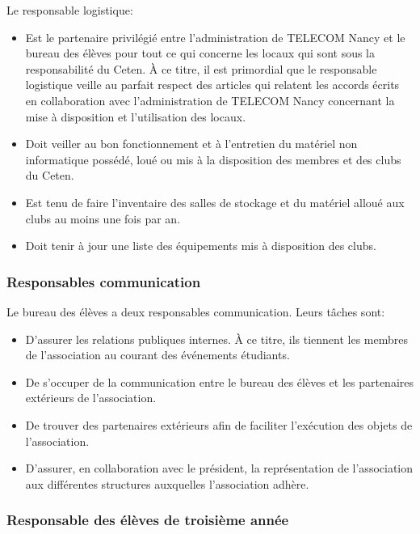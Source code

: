 \documentclass{article} %
\begin{document}
				Le responsable logistique:
				\begin{itemize}
					\item Est le partenaire privilégié entre l’administration de
						TELECOM Nancy et le bureau des élèves pour tout ce qui
						concerne les locaux qui sont sous la responsabilité du
						Ceten. À ce titre, il est primordial que le responsable
						logistique veille au parfait respect des articles qui
						relatent les accords écrits en collaboration avec
						l’administration de TELECOM Nancy concernant la mise à
						disposition et l’utilisation des locaux.
					\item Doit veiller au bon fonctionnement et à l’entretien du
						matériel non informatique possédé, loué ou mis à la
						disposition des membres et des clubs du Ceten.
					\item Est tenu de faire l’inventaire des salles de stockage
						et du matériel alloué aux clubs au moins une fois par
						an.
					\item Doit tenir à jour une liste des équipements mis à
						disposition des clubs.
				\end{itemize}

			\subsubsection{Responsables communication}
\label{ssub:responsables_communication}

				Le bureau des élèves a deux responsables communication. Leurs
				tâches sont:
				\begin{itemize}
					\item D’assurer les relations publiques internes. À ce
						titre, ils tiennent les membres de l’association au
						courant des événements étudiants.
					\item De s’occuper de la communication entre le bureau des
						élèves et les partenaires extérieurs de l’association.
					\item De trouver des partenaires extérieurs afin de
						faciliter l’exécution des objets de l’association.
					\item D’assurer, en collaboration avec le président, la
						représentation de l’association aux différentes
						structures auxquelles l’association adhère. 
				\end{itemize}

			\subsubsection{Responsable des élèves de troisième année}
\label{ssub:responsable_des_eleves_de_troisieme_annee}
\end{document}
